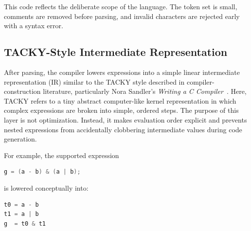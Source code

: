 \documentclass[12pt]{report}
\begin{document}
This code reflects the deliberate scope of the language. The token set is
small, comments are removed before parsing, and invalid characters are rejected
early with a syntax error.

\subsection{TACKY-Style Intermediate Representation}

After parsing, the compiler lowers expressions into a simple linear
intermediate representation (IR) similar to the TACKY style described in
compiler-construction literature, particularly Nora Sandler's
\textit{Writing a C Compiler}~\cite{ref:sandler}. Here, TACKY refers to a tiny abstract
computer-like kernel representation in which complex expressions are broken
into simple, ordered steps. The purpose of this layer is not
optimization. Instead, it makes evaluation order explicit and prevents nested
expressions from accidentally clobbering intermediate values during code
generation.

For example, the supported expression
\begin{center}
\begin{minipage}{0.52\textwidth}
\begin{lstlisting}[language=C]
g = (a - b) & (a | b);
\end{lstlisting}
\end{minipage}
\end{center}

is lowered conceptually into:
\begin{center}
\begin{minipage}{0.35\textwidth}
\begin{lstlisting}[language=C]
t0 = a - b
t1 = a | b
g  = t0 & t1
\end{lstlisting}
\end{minipage}
\end{center}
\end{document}
